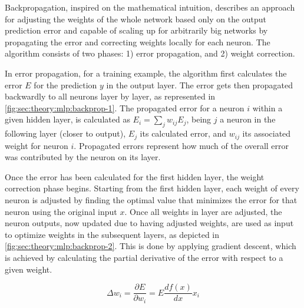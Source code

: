 Backpropagation, inspired on the mathematical intuition, describes an approach for adjusting the weights of the whole network based only on the output prediction error and capable of scaling up for arbitrarily big networks by propagating the error and correcting weights locally for each neuron.
The algorithm consists of two phases: 1) error propagation, and 2) weight correction.

In error propagation, for a training example, the algorithm first calculates the error $E$ for the prediction $y$ in the output layer.
The error gets then propagated backwardly to all neurons layer by layer, as represented in \autoref{fig:sec:theory:mlp:backprop-1}.
The propagated error for a neuron $i$ within a given hidden layer, is calculated as $E_{i} = \sum_j w_{ij} E_{j}$, being $j$ a neuron in the following layer (closer to output), $E_{j}$ its calculated error, and $w_{ij}$ its associated weight for neuron $i$.
Propagated errors represent how much of the overall error was contributed by the neuron on its layer.

Once the error has been calculated for the first hidden layer, the weight correction phase begins.
Starting from the first hidden layer, each weight of every neuron is adjusted by finding the optimal value that minimizes the error for that neuron using the original input $x$.
Once all weights in layer are adjusted, the neuron outputs, now updated due to having adjusted weights, are used as input to optimize weights in the subsequent layers, as depicted in \autoref{fig:sec:theory:mlp:backprop-2}.
 This is done by applying gradient descent, which is achieved by calculating the partial derivative of the error with respect to a given weight.

$$\Delta w_i = \frac{\partial E}{\partial w_i} = E \frac{df(x)}{dx}x_i$$

